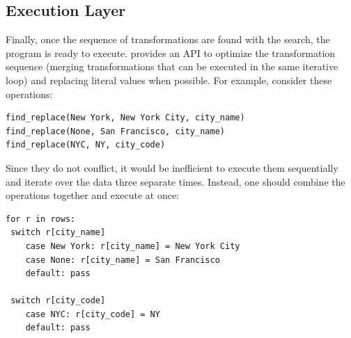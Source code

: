 \subsection{Execution Layer} Finally, once the sequence of transformations are found with the search, the program is ready to execute. \sys provides an API to optimize the transformation sequence (merging transformations that can be executed in the same iterative loop) and replacing literal values when possible. 
For example, consider these operations:
\begin{lstlisting}
find_replace(New York, New York City, city_name)
find_replace(None, San Francisco, city_name)
find_replace(NYC, NY, city_code)
\end{lstlisting}
Since they do not conflict, it would be inefficient to execute them sequentially and iterate over the data three separate times.
Instead, one should combine the operations together and execute at once:
\begin{lstlisting}
for r in rows:
 switch r[city_name]
    case New York: r[city_name] = New York City
    case None: r[city_name] = San Francisco
    default: pass
    
 switch r[city_code]
    case NYC: r[city_code] = NY
    default: pass
\end{lstlisting}

